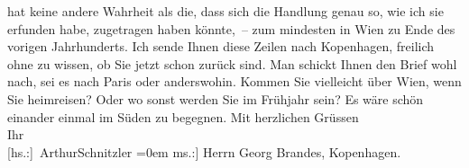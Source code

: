 \begin{ledgroupsized}[t]{13cm}
               hat keine andere Wahrheit als die, dass sich die Handlung genau so, wie ich sie
                  erfunden\strikeout{,} habe, zugetragen haben könnte, – zum
               mindesten in Wien zu Ende des vorigen
               Jahrhunderts.\pend
           \pstart
           Ich sende Ihnen diese Zeilen nach Kopenhagen,
               freilich ohne zu wissen, ob Sie jetzt schon zurück sind. Man schickt Ihnen den Brief
               wohl nach, sei es nach Paris oder anderswohin.
               Kommen Sie vielleicht über Wien, wenn Sie
               heimreisen? Oder wo sonst werden Sie im Frühjahr sein? Es wäre schön einander einmal
               im Süden zu begegnen.\pend
           \pstart
           Mit herzlichen Grüssen{\\[\baselineskip]}Ihr{\\[\baselineskip]}\spacefill\mbox{{[}hs.:{]} ArthurSchnitzler}\pend
           \leftskip=0em{}\pstart
           \noindent{}{[}ms.:{]} Herrn Georg Brandes, Kopenhagen.\pend
           
         
         \endnumbering{}\end{ledgroupsized}  \newcommand{\dateiname}{L02114}\newcommand{\titel}{Arthur Schnitzler an Georg Brandes, 27. 2. 1913}\newcommand{\editorInnen}{Martin Anton Müller und Gerd-Hermann Susen}
      
